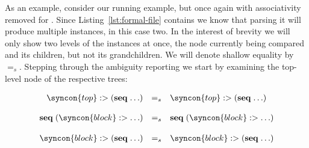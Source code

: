 \documentclass{kththesis}
\begin{document}



As an example, consider our running example, but once again with associativity removed for . Since Listing~\ref{lst:formal-file} contains  we know that parsing it will produce multiple instances, in this case two. In the interest of brevity we will only show two levels of the instances at once, the node currently being compared and its children, but not its grandchildren. We will denote shallow equality by $=_s$. Stepping through the ambiguity reporting we start by examining the top-level node of the respective trees:

$$
\begin{array}{rcl}
\syncon{top} :> (\seq \ldots)
& =_s &
\syncon{top} :> (\seq \ldots) \\
\end{array}
$$

$$
\begin{array}{rcl}
\seq (\syncon{block} :> \ldots)
& =_s &
\seq (\syncon{block} :> \ldots) \\
\end{array}
$$

$$
\begin{array}{rcl}
\syncon{block} :> (\seq \ldots)
& =_s &
\syncon{block} :> (\seq \ldots) \\
\end{array}
$$
\end{document}
